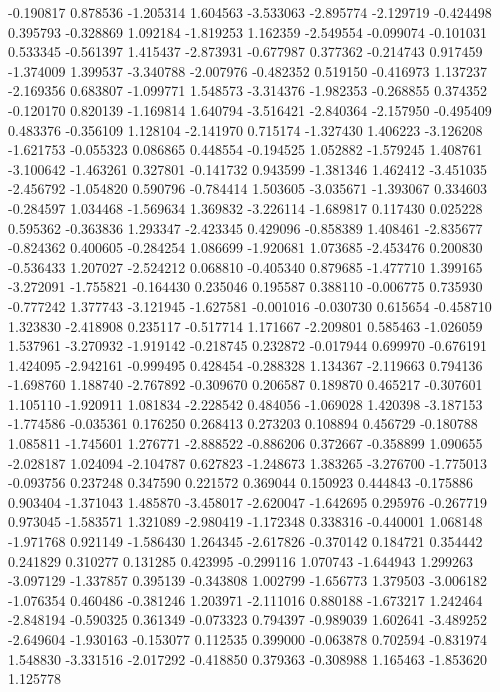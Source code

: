 -0.190817
0.878536
-1.205314
1.604563
-3.533063
-2.895774
-2.129719
-0.424498
0.395793
-0.328869
1.092184
-1.819253
1.162359
-2.549554
-0.099074
-0.101031
0.533345
-0.561397
1.415437
-2.873931
-0.677987
0.377362
-0.214743
0.917459
-1.374009
1.399537
-3.340788
-2.007976
-0.482352
0.519150
-0.416973
1.137237
-2.169356
0.683807
-1.099771
1.548573
-3.314376
-1.982353
-0.268855
0.374352
-0.120170
0.820139
-1.169814
1.640794
-3.516421
-2.840364
-2.157950
-0.495409
0.483376
-0.356109
1.128104
-2.141970
0.715174
-1.327430
1.406223
-3.126208
-1.621753
-0.055323
0.086865
0.448554
-0.194525
1.052882
-1.579245
1.408761
-3.100642
-1.463261
0.327801
-0.141732
0.943599
-1.381346
1.462412
-3.451035
-2.456792
-1.054820
0.590796
-0.784414
1.503605
-3.035671
-1.393067
0.334603
-0.284597
1.034468
-1.569634
1.369832
-3.226114
-1.689817
0.117430
0.025228
0.595362
-0.363836
1.293347
-2.423345
0.429096
-0.858389
1.408461
-2.835677
-0.824362
0.400605
-0.284254
1.086699
-1.920681
1.073685
-2.453476
0.200830
-0.536433
1.207027
-2.524212
0.068810
-0.405340
0.879685
-1.477710
1.399165
-3.272091
-1.755821
-0.164430
0.235046
0.195587
0.388110
-0.006775
0.735930
-0.777242
1.377743
-3.121945
-1.627581
-0.001016
-0.030730
0.615654
-0.458710
1.323830
-2.418908
0.235117
-0.517714
1.171667
-2.209801
0.585463
-1.026059
1.537961
-3.270932
-1.919142
-0.218745
0.232872
-0.017944
0.699970
-0.676191
1.424095
-2.942161
-0.999495
0.428454
-0.288328
1.134367
-2.119663
0.794136
-1.698760
1.188740
-2.767892
-0.309670
0.206587
0.189870
0.465217
-0.307601
1.105110
-1.920911
1.081834
-2.228542
0.484056
-1.069028
1.420398
-3.187153
-1.774586
-0.035361
0.176250
0.268413
0.273203
0.108894
0.456729
-0.180788
1.085811
-1.745601
1.276771
-2.888522
-0.886206
0.372667
-0.358899
1.090655
-2.028187
1.024094
-2.104787
0.627823
-1.248673
1.383265
-3.276700
-1.775013
-0.093756
0.237248
0.347590
0.221572
0.369044
0.150923
0.444843
-0.175886
0.903404
-1.371043
1.485870
-3.458017
-2.620047
-1.642695
0.295976
-0.267719
0.973045
-1.583571
1.321089
-2.980419
-1.172348
0.338316
-0.440001
1.068148
-1.971768
0.921149
-1.586430
1.264345
-2.617826
-0.370142
0.184721
0.354442
0.241829
0.310277
0.131285
0.423995
-0.299116
1.070743
-1.644943
1.299263
-3.097129
-1.337857
0.395139
-0.343808
1.002799
-1.656773
1.379503
-3.006182
-1.076354
0.460486
-0.381246
1.203971
-2.111016
0.880188
-1.673217
1.242464
-2.848194
-0.590325
0.361349
-0.073323
0.794397
-0.989039
1.602641
-3.489252
-2.649604
-1.930163
-0.153077
0.112535
0.399000
-0.063878
0.702594
-0.831974
1.548830
-3.331516
-2.017292
-0.418850
0.379363
-0.308988
1.165463
-1.853620
1.125778
